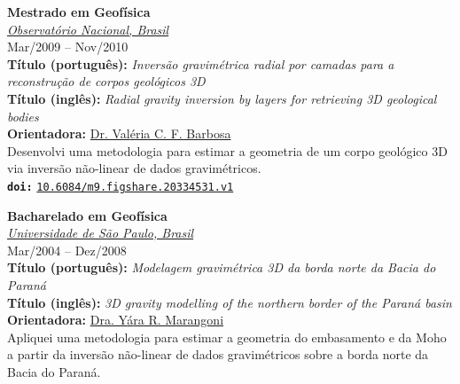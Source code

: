  \textbf{\large Mestrado em Geof{\'i}sica} \\
 \href{https://www.gov.br/observatorio/pt-br}{\textsl{Observat\'{o}rio Nacional, Brasil}} \\  Mar/2009 -- Nov/2010 \vspace{0.3\baselineskip} \\
\noindent \textbf{Título (português):} \textit{Invers\~{a}o gravim\'{e}trica radial por camadas para a reconstru\c{c}\~{a}o de corpos geol\'{o}gicos 3D} \\
\noindent \textbf{Título (inglês):} \textit{Radial gravity inversion by layers for retrieving 3D geological bodies} \\
\noindent \textbf{Orientadora:} \href{https://orcid.org/0000-0002-9767-6044}{Dr. Val{\'e}ria C. F. Barbosa} \\
\noindent{}
Desenvolvi uma metodologia para
estimar a geometria de um corpo geol{\'o}gico 3D via invers{\~a}o n{\~a}o-linear 
de dados gravimétricos. \\
\noindent \texttt{\textbf{doi:}} \href{https://doi.org/10.6084/m9.figshare.20334531.v1}{ \texttt{10.6084/m9.figshare.20334531.v1}} \\

\medskip

 \textbf{\large Bacharelado em Geof{\'i}sica} \\
 \href{https://www.iag.usp.br/international/}{\textsl{Universidade de S\~{a}o Paulo, Brasil}} \\
 Mar/2004 -- Dez/2008 \vspace{0.3\baselineskip} \\
\noindent \textbf{T{\'i}tulo (portugu{\^e}s):} \textit{Modelagem gravim\'{e}trica 3D da borda norte da Bacia do Paran\'{a}} \\
\noindent \textbf{T{\'i}tulo (ingl{\^e}s):} \textit{3D gravity modelling of the northern border of the Paran\'{a} basin} \\
\noindent \textbf{Orientadora:} \href{https://orcid.org/0000-0003-4329-1787}{Dra. Y{\'a}ra R. Marangoni} \\
\noindent{}
Apliquei uma metodologia para estimar a geometria do 
embasamento e da Moho a partir da inversão não-linear de dados gravimétricos 
sobre a borda norte da Bacia do Paraná.



